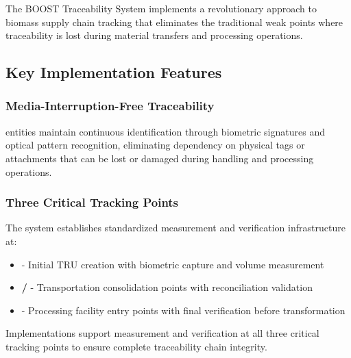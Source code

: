 
The BOOST Traceability System implements a revolutionary approach to biomass supply chain tracking that eliminates the traditional weak points where traceability is lost during material transfers and processing operations.

\subsection{Key Implementation Features}
\label{sec:key-implementation-features}

\subsubsection{Media-Interruption-Free Traceability}
\label{sec:media-interruption-free}

\begin{important}[title=Revolutionary Traceability Approach]
\TRU{} entities maintain continuous identification through biometric signatures and optical pattern recognition, eliminating dependency on physical tags or attachments that can be lost or damaged during handling and processing operations.
\end{important}

\subsubsection{Three Critical Tracking Points}
\label{sec:three-critical-tracking-points}

The system establishes standardized measurement and verification infrastructure at:

\begin{itemize}
    \item \textbf{} - Initial TRU creation with biometric capture and volume measurement
    \item \textbf{/} - Transportation consolidation points with reconciliation validation
    \item \textbf{} - Processing facility entry points with final verification before transformation
\end{itemize}

\begin{normative}[title=Critical Tracking Point Requirements]
Implementations \MUST{} support measurement and verification at all three critical tracking points to ensure complete traceability chain integrity.
\end{normative}

